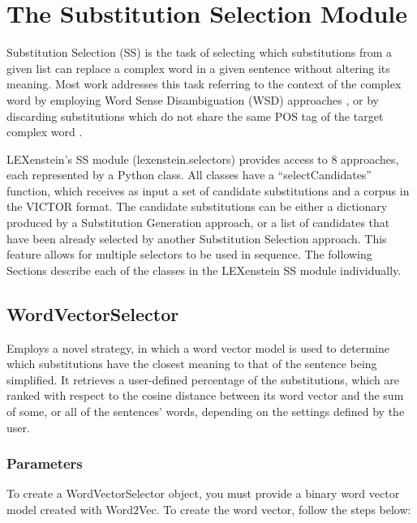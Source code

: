 \chapter{The Substitution Selection Module}
\label{selectors}

Substitution Selection (SS) is the task of selecting which substitutions from a given list can replace a complex word in a given sentence without altering its meaning. Most work addresses this task referring to the context of the complex word by employing Word Sense Disambiguation (WSD) approaches \cite{Sedding04,Nunes2013}, or by discarding substitutions which do not share the same POS tag of the target complex word \cite{Yamamoto2013,Paetzold2013}.

LEXenstein's SS module (lexenstein.selectors) provides access to $8$ approaches, each represented by a Python class. All classes have a ``selectCandidates'' function, which receives as input a set of candidate substitutions and a corpus in the VICTOR format. The candidate substitutions can be either a dictionary produced by a Substitution Generation approach, or a list of candidates that have been already selected by another Substitution Selection approach. This feature allows for multiple selectors to be used in sequence. The following Sections describe each of the classes in the LEXenstein SS module individually.







\section{WordVectorSelector}

Employs a novel strategy, in which a word vector model is used to determine which substitutions have the closest meaning to that of the sentence being simplified. It retrieves a user-defined percentage of the substitutions, which are ranked with respect to the cosine distance between its word vector and the sum of some, or all of the sentences' words, depending on the settings defined by the user.


\subsection{Parameters}

To create a WordVectorSelector object, you must provide a binary word vector model created with Word$2$Vec. To create the word vector, follow the steps below:

